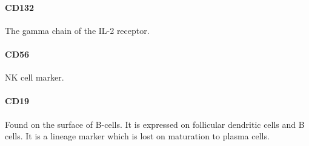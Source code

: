 \paragraph{CD132}
The gamma chain of the IL-2 receptor.

\paragraph{CD56}
NK cell marker.


\paragraph{CD19}
Found on the surface of B-cells.
It is expressed on follicular dendritic cells and B cells.
It is a lineage marker which is lost on maturation to plasma cells.


